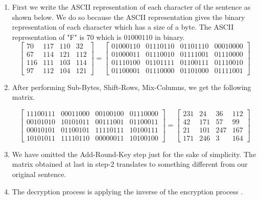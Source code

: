 \documentclass[a4paper,twoside,10pt]{article}
\theoremstyle{plain}
\theoremstyle{definition}
\begin{document}
\begin{enumerate}
\item First we write the ASCII representation of each character of the sentence as shown below. We do so because the ASCII representation gives the binary representation of each character which has a size of a byte. The ASCII representation of "F" is \(70\) which is \(01000110\) in binary.
  \[\begin{bmatrix}
      70 & 117 & 110 & 32 \\
      67 & 114 & 121 & 112\\
      116 & 111 & 103 & 114 \\
      97 & 112 & 104 & 121
    \end{bmatrix}=
    \begin{bmatrix}
      01000110 & 01110110 & 01101110 & 00010000 \\
      01000011 & 01110010 & 01111001 & 01110000\\
      01110100 & 01101111 & 01100111 & 01110010 \\
      01100001 & 01110000 & 01101000 & 01111001
    \end{bmatrix}
  \]


\item After performing Sub-Bytes, Shift-Rows, Mix-Columns, we get the following matrix.

  \[\begin{bmatrix}
      11100111 & 00011000 & 00100100 & 01110000\\
      00101010 & 10101011 & 00111001 & 01100011\\
      00010101 & 01100101 & 11110111 & 10100111\\
      10101011 & 11110110 & 00000011 & 10100100
    \end{bmatrix}=
    \begin{bmatrix}
      231 & 24 & 36 & 112\\
      42 & 171 & 57 & 99\\
      21 & 101 & 247 & 167\\
      171 & 246 & 3 & 164
    \end{bmatrix}
  \]

\item We have omitted the Add-Round-Key step just for the sake of simplicity. The matrix obtained at last in step-2 translates to something different from our original sentence.

\item The decryption process is applying the inverse of the encryption process \cite{aes}.
\end{enumerate}
\end{document}
